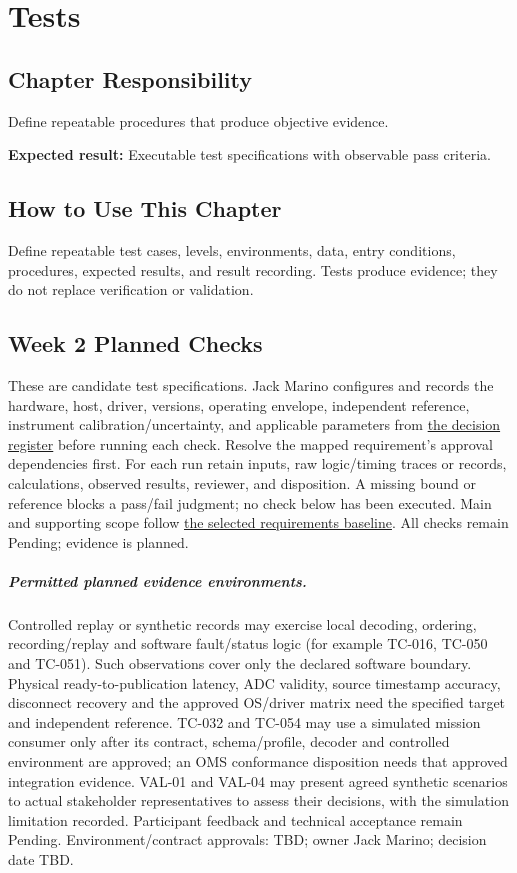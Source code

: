 \chapter{Tests}
\section{Chapter Responsibility}
\label{Section:TestsResponsibility}
Define repeatable procedures that produce objective evidence.

\noindent\textbf{Expected result:} Executable test specifications with observable pass criteria.

\section{How to Use This Chapter}
Define repeatable test cases, levels, environments, data, entry conditions, procedures, expected results, and result recording. Tests produce evidence; they do not replace verification or validation.
\section{Week 2 Planned Checks}
\label{Section:WeekTwoTests}
These are candidate test specifications. Jack Marino configures and records
the hardware, host, driver, versions, operating envelope, independent reference,
instrument calibration/uncertainty, and applicable parameters from
\hyperref[Table:RequirementParameters]{the decision register} before running
each check. Resolve the mapped requirement's approval dependencies first.
For each run retain inputs, raw logic/timing traces or records, calculations,
observed results, reviewer, and disposition. A missing bound or reference
blocks a pass/fail judgment; no check below has been executed.
Main and supporting scope follow \hyperref[Table:MainBaseline]{the selected requirements baseline}. All checks remain Pending; evidence is planned.
\paragraph{Permitted planned evidence environments.} Controlled replay or synthetic records may exercise local decoding, ordering, recording/replay and software fault/status logic (for example TC-016, TC-050 and TC-051). Such observations cover only the declared software boundary. Physical ready-to-publication latency, ADC validity, source timestamp accuracy, disconnect recovery and the approved OS/driver matrix need the specified target and independent reference. TC-032 and TC-054 may use a simulated mission consumer only after its contract, schema/profile, decoder and controlled environment are approved; an OMS conformance disposition needs that approved integration evidence. VAL-01 and VAL-04 may present agreed synthetic scenarios to actual stakeholder representatives to assess their decisions, with the simulation limitation recorded. Participant feedback and technical acceptance remain Pending. Environment/contract approvals: TBD; owner Jack Marino; decision date TBD.
